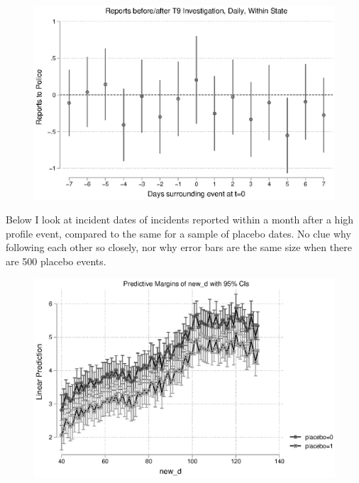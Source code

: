 \documentclass[AER,draftmode]{AEA}
\begin{document}
\begin{figure}
\includegraphics[width=\linewidth]{figures/police_state_cases.eps}
\end{figure}

\clearpage
Below I look at incident dates of incidents reported within a month after a high profile event, compared to the same for a sample of placebo dates. No clue why following each other so closely, nor why error bars are the same size when there are 500 placebo events. 

\begin{figure}
\includegraphics[width=\linewidth]{figures/idt_analysis.eps}
\end{figure}
\end{document}

